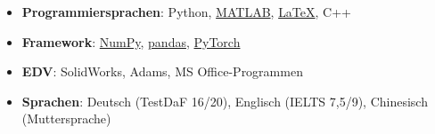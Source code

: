   \begin{itemize}[leftmargin=*]
    \item \textbf{Programmiersprachen}: Python, \href{https://www.mathworks.com/}{MATLAB}, \href{https://www.latex-project.org/}{\LaTeX}, C++
    \item \textbf{Framework}: \href{http://www.numpy.org/}{NumPy}, \href{https://pandas.pydata.org/}{pandas}, \href{https://pytorch.org/}{PyTorch}
    \item \textbf{EDV}: SolidWorks, Adams, MS Office-Programmen
    \item \textbf{Sprachen}: Deutsch {\color{labelgrey}(TestDaF 16/20)}, Englisch {\color{labelgrey}(IELTS 7,5/9)}, Chinesisch {\color{labelgrey}(Muttersprache)}
  \end{itemize}